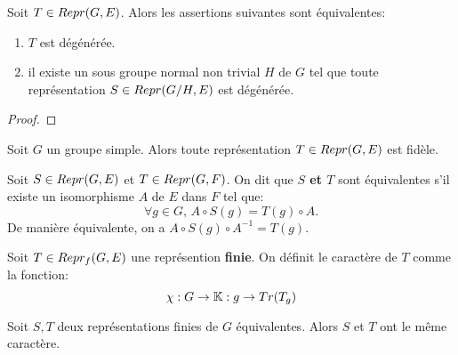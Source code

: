 \begin{proposition}
	Soit $T \in Repr(G, E)$.
	Alors les assertions suivantes sont équivalentes:
	\begin{enumerate}
		\item $T$ est dégénérée.
		\item il existe un sous groupe normal non trivial $H$ de $G$ tel que
			toute représentation $S \in Repr(G/H, E)$ est dégénérée.
	\end{enumerate}
\end{proposition}

\begin{proof}

\end{proof}

\begin{corollary}
	Soit $G$ un groupe simple. Alors toute représentation $T \in Repr(G, E)$
	est fidèle.
\end{corollary}

\begin{definition}
	Soit $S \in Repr(G, E)$ et $T \in Repr(G, F)$.
	On dit que \textbf{$S$ et $T$} sont équivalentes s'il existe un isomorphisme
	$A$ de $E$ dans $F$ tel que:
	\begin{equation}
		\forall g \in G, \, A \circ S(g) = T(g) \circ A.
	\end{equation}
	De manière équivalente, on a $A \circ S(g) \circ A^{-1} = T(g)$.
\end{definition}

\begin{definition}
	Soit $T \in Repr_{f}(G, E)$ une représention \textbf{finie}.
	On définit le caractère de $T$ comme la fonction:
	\begin{equation}
		\chi : G \rightarrow \mathbb{K} : g \rightarrow Tr(T_{g})
	\end{equation}
\end{definition}

\begin{proposition}
	Soit $S, T$ deux représentations finies de $G$ équivalentes. Alors $S$ et
	$T$ ont le même caractère.
\end{proposition}
